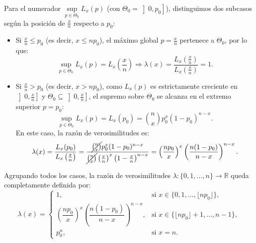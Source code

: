\begin{ejercicio}
\begin{itemize}
        Para el numerador $\sup\limits_{p \in \Theta_0} L_x(p)$ (con $\Theta_0 = \left]0, p_0\right]$), distinguimos dos subcasos según la posición de $\frac{x}{n}$ respecto a $p_0$:
        \begin{itemize}
            \item Si $\frac{x}{n} \leq p_0$ (es decir, $x \leq np_0$), el máximo global $p = \frac{x}{n}$ pertenece a $\Theta_0$, por lo que:
            \begin{equation*}
                \sup\limits_{p \in \Theta_0} L_x(p) = L_x\left(\frac{x}{n}\right) \Longrightarrow \lambda(x) = \frac{L_x\left(\frac{x}{n}\right)}{L_x\left(\frac{x}{n}\right)} = 1.
            \end{equation*}

            \item Si $\frac{x}{n} > p_0$ (es decir, $x > np_0$), como $L_x(p)$ es estrictamente creciente en $\left]0, \frac{x}{n}\right]$ y $\Theta_0 \subseteq \left]0, \frac{x}{n}\right]$, el supremo sobre $\Theta_0$ se alcanza en el extremo superior $p = p_0$:
            \begin{equation*}
                \sup\limits_{p \in \Theta_0} L_x(p) = L_x(p_0) = \binom{n}{x} p_0^x (1 - p_0)^{n - x}.
            \end{equation*}
            En este caso, la razón de verosimilitudes es:
            \begin{equation*}
                \lambda(x) = \frac{L_x(p_0)}{L_x\left(\frac{x}{n}\right)} = \frac{\cancel{\binom{n}{x}} p_0^x (1 - p_0)^{n - x}}{\cancel{\binom{n}{x}} \left(\frac{x}{n}\right)^x \left(1 - \frac{x}{n}\right)^{n - x}} = \left(\frac{np_0}{x}\right)^x \left(\frac{n(1 - p_0)}{n - x}\right)^{n - x}.
            \end{equation*}
        \end{itemize}
    \end{itemize}

    Agrupando todos los casos, la razón de verosimilitudes $\lambda: \{0, 1, \ldots, n\} \to \mathbb{R}$ queda completamente definida por:
    \begin{equation*}
        \lambda(x) =
        \begin{cases}
            1, & \text{si } x \in \{0, 1, \ldots, \lfloor np_0 \rfloor\}, \\[6pt]
            \left(\dfrac{np_0}{x}\right)^x \left(\dfrac{n(1 - p_0)}{n - x}\right)^{n - x}, & \text{si } x \in \{\lfloor np_0 \rfloor + 1, \ldots, n - 1\}, \\[10pt]
            p_0^n, & \text{si } x = n.
        \end{cases}
    \end{equation*}


\end{ejercicio}
